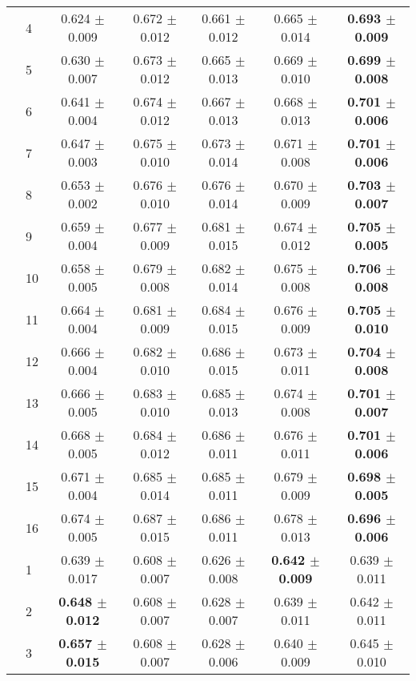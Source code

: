 \begin{table*}[t]
{\begin{tabular}{ll c c c c c}
        & 4 & 0.624 $\pm$ 0.009 & 0.672 $\pm$ 0.012 & 0.661 $\pm$ 0.012 & 0.665 $\pm$ 0.014 & \textbf{0.693 $\pm$ 0.009} \\
        & 5 & 0.630 $\pm$ 0.007 & 0.673 $\pm$ 0.012 & 0.665 $\pm$ 0.013 & 0.669 $\pm$ 0.010 & \textbf{0.699 $\pm$ 0.008} \\
        & 6 & 0.641 $\pm$ 0.004 & 0.674 $\pm$ 0.012 & 0.667 $\pm$ 0.013 & 0.668 $\pm$ 0.013 & \textbf{0.701 $\pm$ 0.006} \\
        & 7 & 0.647 $\pm$ 0.003 & 0.675 $\pm$ 0.010 & 0.673 $\pm$ 0.014 & 0.671 $\pm$ 0.008 & \textbf{0.701 $\pm$ 0.006} \\
        & 8 & 0.653 $\pm$ 0.002 & 0.676 $\pm$ 0.010 & 0.676 $\pm$ 0.014 & 0.670 $\pm$ 0.009 & \textbf{0.703 $\pm$ 0.007} \\
        & 9 & 0.659 $\pm$ 0.004 & 0.677 $\pm$ 0.009 & 0.681 $\pm$ 0.015 & 0.674 $\pm$ 0.012 & \textbf{0.705 $\pm$ 0.005} \\
        & 10 & 0.658 $\pm$ 0.005 & 0.679 $\pm$ 0.008 & 0.682 $\pm$ 0.014 & 0.675 $\pm$ 0.008 & \textbf{0.706 $\pm$ 0.008} \\
        & 11 & 0.664 $\pm$ 0.004 & 0.681 $\pm$ 0.009 & 0.684 $\pm$ 0.015 & 0.676 $\pm$ 0.009 & \textbf{0.705 $\pm$ 0.010} \\
        & 12 & 0.666 $\pm$ 0.004 & 0.682 $\pm$ 0.010 & 0.686 $\pm$ 0.015 & 0.673 $\pm$ 0.011 & \textbf{0.704 $\pm$ 0.008} \\
        & 13 & 0.666 $\pm$ 0.005 & 0.683 $\pm$ 0.010 & 0.685 $\pm$ 0.013 & 0.674 $\pm$ 0.008 & \textbf{0.701 $\pm$ 0.007} \\
        & 14 & 0.668 $\pm$ 0.005 & 0.684 $\pm$ 0.012 & 0.686 $\pm$ 0.011 & 0.676 $\pm$ 0.011 & \textbf{0.701 $\pm$ 0.006} \\
        & 15 & 0.671 $\pm$ 0.004 & 0.685 $\pm$ 0.014 & 0.685 $\pm$ 0.011 & 0.679 $\pm$ 0.009 & \textbf{0.698 $\pm$ 0.005} \\
        & 16 & 0.674 $\pm$ 0.005 & 0.687 $\pm$ 0.015 & 0.686 $\pm$ 0.011 & 0.678 $\pm$ 0.013 & \textbf{0.696 $\pm$ 0.006} \\
\midrule
\assist{} & 1 & 0.639 $\pm$ 0.017 & 0.608 $\pm$ 0.007 & 0.626 $\pm$ 0.008 & \textbf{0.642 $\pm$ 0.009} & 0.639 $\pm$ 0.011 \\
        & 2 & \textbf{0.648 $\pm$ 0.012} & 0.608 $\pm$ 0.007 & 0.628 $\pm$ 0.007 & 0.639 $\pm$ 0.011 & 0.642 $\pm$ 0.011 \\
        & 3 & \textbf{0.657 $\pm$ 0.015} & 0.608 $\pm$ 0.007 & 0.628 $\pm$ 0.006 & 0.640 $\pm$ 0.009 & 0.645 $\pm$ 0.010 \\

\end{tabular}}
\end{table*}
